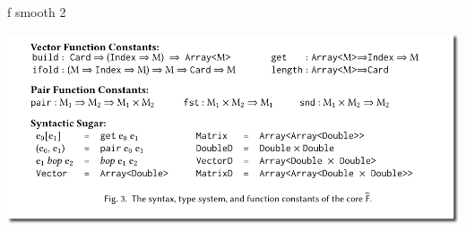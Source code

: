 \documentclass[smaller]{beamer}
\begin{document}
\begin{frame}{f smooth 2}

\begin{center}
\includegraphics[width=.9\linewidth]{fsmooth2.png}
\end{center}

\end{frame}
\end{document}
